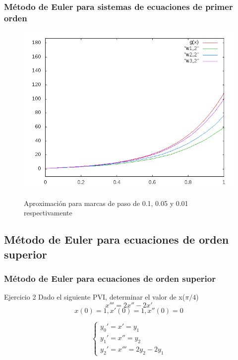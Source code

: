 \documentclass{beamer}
\begin{document}
\begin{frame}
	\frametitle{Método de Euler para sistemas de ecuaciones de primer orden}
	
	\begin{figure}[H]
		\centering
		\includegraphics[scale=0.4]{img/grafica3.png}
		\label{figura1}
		\caption{Aproximación para marcas de paso de 0.1, 0.05 y 0.01 respectivamente} 
	\end{figure}
	
\end{frame}

\subsection{Método de Euler para ecuaciones de orden superior}

\begin{frame}
	\frametitle{Método de Euler para ecuaciones de orden superior}


\begin{block}{Ejercicio 2}
	Dado el siguiente PVI, determinar el valor de x($\pi/4$)
	$$
	x''' = 2x'' - 2x'     %
	$$
	$$
	x(0)=1, x'(0)=1, x''(0)=0
	$$
\end{block}

$$
\begin{cases}
y_0' = x' = y_1\\
y_1' = x'' = y_2\\
y_2' = x''' = 2y_2 - 2y_1
\end{cases}
$$

\end{frame}
\end{document}
